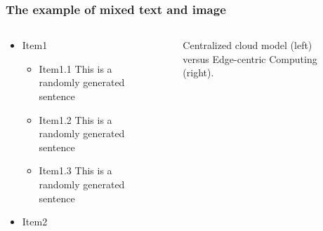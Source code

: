 \documentclass{../../../Cls/SDU/Beamer/Beamer}
\begin{document}
\begin{frame}
    \frametitle{The example of mixed text and image} %

    \begin{columns}[T] %
        \begin{column}{.65\textwidth}
            \begin{itemize}
                \item Item1
                      \begin{itemize}
                          \item Item1.1 This is a randomly generated sentence
                          \item Item1.2 This is a randomly generated sentence
                          \item Item1.3 This is a randomly generated sentence
                      \end{itemize}
                \item Item2
            \end{itemize}
        \end{column}%
        \hfill%
        \begin{column}{.40\textwidth}
            \begin{figure}[htpb] %
                \centering %
                \caption{Centralized cloud model (left) versus Edge-centric Computing (right).} %
                \label{fig:edge} %
            \end{figure}
        \end{column}%
    \end{columns}
\end{frame}
\end{document}
